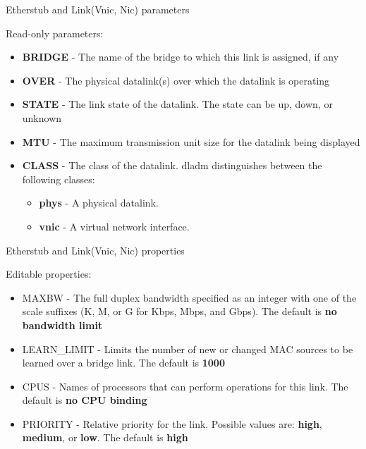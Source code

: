 \documentclass{beamer}
\begin{document}
		\begin{frame}{Etherstub and Link(Vnic, Nic) parameters }

			Read-only parameters:
			
			\begin{itemize}

				\item \textbf{BRIDGE} - The name of the bridge to which this link is assigned, if any
				\item \textbf{OVER} - The physical datalink(s) over which the datalink is operating
				\item \textbf{STATE} - The link state of the datalink. The state can be up, down, or unknown
				\item \textbf{MTU} - The maximum transmission unit size for the datalink being displayed
				\item \textbf{CLASS} - The class of the datalink. dladm distinguishes between the following classes:

					\begin{itemize}
						\item \textbf{phys} - A physical datalink. 
						\item \textbf{vnic} - A virtual network interface. 				
					\end{itemize}			
			\end{itemize}

		\end{frame}

		\begin{frame}{Etherstub and Link(Vnic, Nic) properties }

			Editable properties:
			
			\begin{itemize}

				\item MAXBW - The full duplex bandwidth specified as an integer with one of the scale suffixes (K, M, or G for Kbps, Mbps, and Gbps). The default is \textbf{no bandwidth limit}
				\item LEARN\_LIMIT - Limits the number of new or changed MAC sources to be learned over a bridge link. The default is \textbf{1000}
				\item CPUS - Names of processors that can perform operations for this link. The default is \textbf{no CPU binding}
				\item PRIORITY - Relative priority for the link. Possible values are: \textbf{high}, \textbf{medium}, or \textbf{low}. The default is \textbf{high}
			
			\end{itemize}

		\end{frame}
\end{document}
